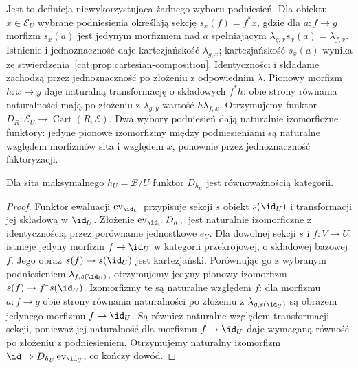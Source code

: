 Jest to definicja niewykorzystująca żadnego wyboru podniesień. Dla obiektu $x\in\mathcal E_U$ wybrane podniesienia określają sekcję $s_x(f)=f^*x$, gdzie dla $a:f\to g$ morfizm $s_x(a)$ jest jedynym morfizmem nad $a$ spełniającym $\lambda_{g,x}s_x(a)=\lambda_{f,x}$. Istnienie i jednoznaczność daje kartezjańskość $\lambda_{g,x}$; kartezjańskość $s_x(a)$ wynika ze stwierdzenia~\ref{cat:prop:cartesian-composition}. Identyczności i składanie zachodzą przez jednoznaczność po złożeniu z odpowiednim $\lambda$. Pionowy morfizm $h:x\to y$ daje naturalną transformację o składowych $f^*h$: obie strony równania naturalności mają po złożeniu z $\lambda_{g,y}$ wartość $h\lambda_{f,x}$. Otrzymujemy funktor $D_R:\mathcal E_U\to\operatorname{Cart}(R,\mathcal E)$. Dwa wybory podniesień dają naturalnie izomorficzne funktory: jedyne pionowe izomorfizmy między podniesieniami są naturalne względem morfizmów sita i względem $x$, ponownie przez jednoznaczność faktoryzacji.

\begin{stwierdzenie}\label{cat:prop:descent-maximal-sieve}
Dla sita maksymalnego $h_U=\mathcal B/U$ funktor $D_{h_U}$ jest równoważnością kategorii.
\end{stwierdzenie}
\begin{proof}
Funktor ewaluacji $\operatorname{ev}_{\id_U}$ przypisuje sekcji $s$ obiekt $s(\id_U)$ i transformacji jej składową w $\id_U$. Złożenie $\operatorname{ev}_{\id_U}D_{h_U}$ jest naturalnie izomorficzne z identycznością przez porównanie jednostkowe $e_U$. Dla dowolnej sekcji $s$ i $f:V\to U$ istnieje jedyny morfizm $f\to\id_U$ w kategorii przekrojowej, o składowej bazowej $f$. Jego obraz $s(f)\to s(\id_U)$ jest kartezjański. Porównując go z wybranym podniesieniem $\lambda_{f,s(\id_U)}$, otrzymujemy jedyny pionowy izomorfizm $s(f)\to f^*s(\id_U)$. Izomorfizmy te są naturalne względem $f$: dla morfizmu $a:f\to g$ obie strony równania naturalności po złożeniu z $\lambda_{g,s(\id_U)}$ są obrazem jedynego morfizmu $f\to\id_U$. Są również naturalne względem transformacji sekcji, ponieważ jej naturalność dla morfizmu $f\to\id_U$ daje wymaganą równość po złożeniu z podniesieniem. Otrzymujemy naturalny izomorfizm $\id\Rightarrow D_{h_U}\operatorname{ev}_{\id_U}$, co kończy dowód.
\end{proof}


